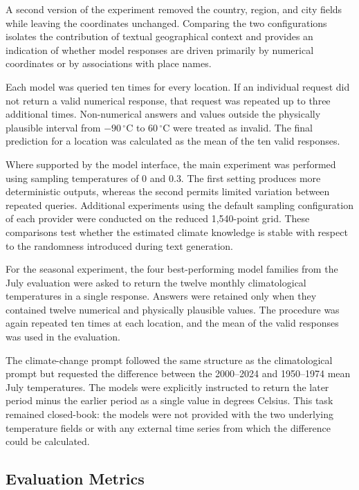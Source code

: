 A second version of the experiment removed the country, region, and city fields while leaving the coordinates unchanged. Comparing the two configurations isolates the contribution of textual geographical context and provides an indication of whether model responses are driven primarily by numerical coordinates or by associations with place names.

Each model was queried ten times for every location. If an individual request did not return a valid numerical response, that request was repeated up to three additional times. Non-numerical answers and values outside the physically plausible interval from \(-90\,^{\circ}\mathrm{C}\) to \(60\,^{\circ}\mathrm{C}\) were treated as invalid. The final prediction for a location was calculated as the mean of the ten valid responses.

Where supported by the model interface, the main experiment was performed using sampling temperatures of 0 and 0.3. The first setting produces more deterministic outputs, whereas the second permits limited variation between repeated queries. Additional experiments using the default sampling configuration of each provider were conducted on the reduced 1,540-point grid. These comparisons test whether the estimated climate knowledge is stable with respect to the randomness introduced during text generation.

For the seasonal experiment, the four best-performing model families from the July evaluation were asked to return the twelve monthly climatological temperatures in a single response. Answers were retained only when they contained twelve numerical and physically plausible values. The procedure was again repeated ten times at each location, and the mean of the valid responses was used in the evaluation.

The climate-change prompt followed the same structure as the climatological prompt but requested the difference between the 2000--2024 and 1950--1974 mean July temperatures. The models were explicitly instructed to return the later period minus the earlier period as a single value in degrees Celsius. This task remained closed-book: the models were not provided with the two underlying temperature fields or with any external time series from which the difference could be calculated.


\subsection{Evaluation Metrics}

